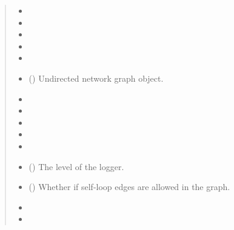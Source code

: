 \documentclass[letterpaper,10pt,english]{sphinxmanual}
\begin{document}
\begin{fulllineitems}
\begin{quote}
\begin{description}
\begin{itemize}
\item {} 
 \textendash{} 

\item {} 
 \textendash{} 

\item {} 
 \textendash{} 

\item {} 
 \textendash{} 

\item {} 
 \textendash{} 

\item {} 
 () \textendash{} Undirected network graph object.

\item {} 
 \textendash{} 

\item {} 
 \textendash{} 

\item {} 
 \textendash{} 

\item {} 
 \textendash{} 

\item {} 
 \textendash{} 

\item {} 
 () \textendash{} The level of the logger.

\item {} 
 () \textendash{} Whether if self-loop edges are allowed in the graph.

\item {} 
 \textendash{} 

\item {} 
 \textendash{} 


\end{itemize}
\end{description}
\end{quote}
\end{fulllineitems}
\end{document}
